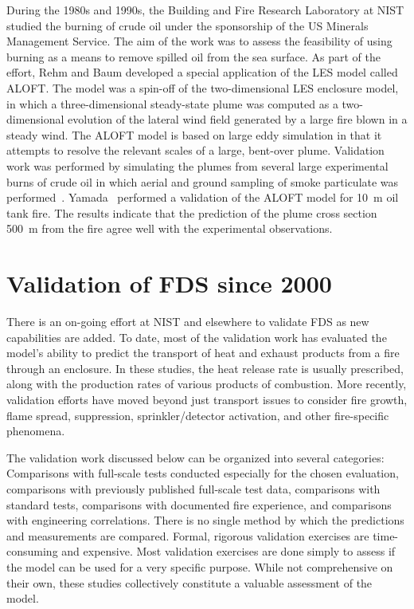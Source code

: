During the 1980s and 1990s,  the Building and Fire Research Laboratory at NIST studied the burning of  crude oil under the sponsorship of the US
Minerals Management Service.  The aim of the work was to assess the feasibility of using burning as a means to remove spilled oil from the sea
surface. As part of the  effort, Rehm and Baum developed a special application of the LES model called ALOFT. The model was a spin-off of the
two-dimensional LES enclosure  model, in which a three-dimensional steady-state plume was computed  as a two-dimensional evolution of the lateral
wind field  generated by a large fire blown  in a steady wind. The ALOFT model is based on  large eddy simulation in that it attempts to resolve the
relevant scales of a large, bent-over plume. Validation work  was  performed  by  simulating  the plumes  from  several  large experimental burns of
crude oil in which aerial and ground sampling of smoke       particulate       was       performed~\cite{McGrattan:4a}. Yamada~\cite{ALOFT:2}
performed  a validation  of the ALOFT  model for 10~m oil  tank fire. The results  indicate that the  prediction of the plume  cross  section  500~m
from   the  fire  agree  well  with  the experimental observations.




\section{Validation of FDS since 2000}

There is an  on-going effort at NIST and elsewhere  to validate FDS as new capabilities are  added. To date, most of  the validation work has
evaluated the  model's ability  to predict the  transport of  heat and exhaust products from  a fire through an enclosure.  In these studies, the
heat release rate is usually prescribed, along with the production rates of  various products  of combustion.  More  recently, validation efforts
have moved  beyond  just transport  issues  to consider  fire growth, flame spread,  suppression, sprinkler/detector activation, and other
fire-specific phenomena.

The  validation work  discussed below  can be  organized  into several categories: Comparisons with full-scale tests conducted especially for the
chosen  evaluation,   comparisons   with  previously   published full-scale  test data,  comparisons with  standard  tests, comparisons with
documented  fire experience,  and  comparisons with  engineering correlations.  There is no single  method by which the predictions and measurements
are compared.   Formal, rigorous validation exercises are time-consuming  and  expensive.  Most  validation exercises  are  done simply to assess if
the model can be used for a very specific purpose. While  not  comprehensive on  their  own,  these studies  collectively constitute a valuable
assessment of the model.


